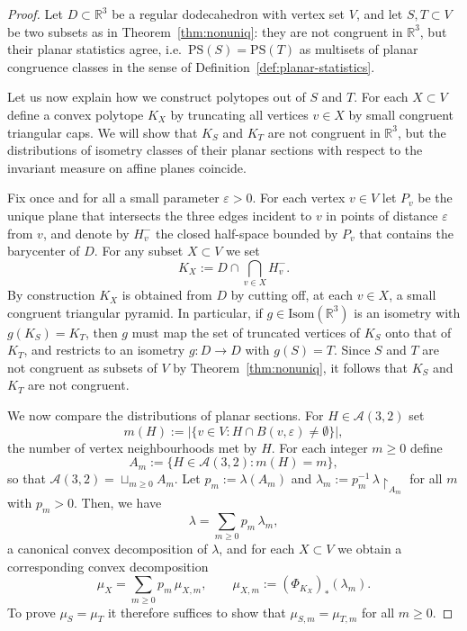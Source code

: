 \documentclass[10pt,a4paper]{amsart}
\begin{document}
\begin{proof}
Let $D\subset\mathbb{R}^3$ be a regular dodecahedron with vertex set $V$, and
let $S,T\subset V$ be two subsets as in Theorem~\ref{thm:nonuniq}: they
are not congruent in $\mathbb{R}^3$, but their planar statistics agree, i.e.\ 
$\mathrm{PS}(S) = \mathrm{PS}(T)$
as multisets of planar congruence classes in the sense of
Definition~\ref{def:planar-statistics}.


Let us now explain how we construct polytopes out of $S$ and $T$. For each $X\subset V$ define a convex polytope $K_X$ by truncating all vertices
$v\in X$ by small congruent triangular caps. We will show that $K_S$ and $K_T$ are not
congruent in $\mathbb{R}^3$, but the distributions of isometry classes of their
planar sections with respect to the invariant measure on affine planes coincide.

Fix once and for all a small parameter $\varepsilon>0$.
For each vertex $v\in V$ let $P_v$ be the unique plane that intersects the three
edges incident to $v$ in points of distance $\varepsilon$ from $v$, and denote
by $H_v^-$ the closed half-space bounded by $P_v$ that contains the barycenter
of $D$. For any subset $X\subset V$ we set
\[
K_X := D\cap\bigcap_{v\in X} H_v^-.
\]
By construction $K_X$ is obtained from $D$ by cutting off, at each $v\in X$, a
small congruent triangular pyramid. In particular, if $g\in \mathrm{Isom}(\mathbb{R}^3)$ is an
isometry with $g(K_S)=K_T$, then $g$ must map the set of truncated vertices of
$K_S$ onto that of $K_T$, and restricts to an isometry $g\colon D\to D$ with
$g(S)=T$. Since $S$ and $T$ are not congruent as subsets of $V$ by
Theorem~\ref{thm:nonuniq}, it follows that $K_S$ and $K_T$ are not
congruent.

We now compare the distributions of planar sections. For
$H\in\mathcal{A}(3,2)$ set
\[
m(H) := \bigl|\{v\in V : H\cap B(v,\varepsilon)\neq\emptyset\}\bigr|,
\]
the number of vertex neighbourhoods met by $H$. For each integer $m\ge 0$ define
\[
A_m := \{H\in\mathcal{A}(3,2) : m(H)=m\},
\]
so that $\mathcal{A}(3,2) = \sqcup_{m\ge 0} A_m.$
Let $p_m := \lambda(A_m)$ and $\lambda_m := p_m^{-1}\,\lambda\!\restriction_{A_m}$
for all $m$ with $p_m>0$. Then, we have
\[
\lambda = \sum_{m\ge 0} p_m\,\lambda_m,
\]
a canonical convex decomposition of $\lambda$, and for each $X\subset V$ we
obtain a corresponding convex decomposition
\[
\mu_X = \sum_{m\ge 0} p_m\,\mu_{X,m},
\qquad
\mu_{X,m} := (\Phi_{K_X})_*(\lambda_m).
\]
To prove $\mu_S=\mu_T$ it therefore suffices to show that $\mu_{S,m} = \mu_{T,m}$ for all $m\ge 0$.
\medskip


\end{proof}
\end{document}
